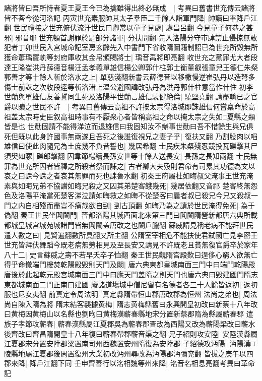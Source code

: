 諸將皆曰吾所恃者夏王夏王今已為擒雖得出終必無成　|{
	考異曰舊書世充傳云諸將皆不荅今從河洛記}
丙寅世充素服帥其太子羣臣二千餘人詣軍門降|{
	帥讀曰率降戶江翻}
世民禮接之世充俯伏流汗世民曰卿常以童子見處|{
	處昌呂翻}
今見童子何恭之甚邪|{
	邪音耶}
世充頓首謝罪於是部分諸軍|{
	分扶問翻}
先入洛陽分守市肆禁止侵掠無敢犯者丁卯世民入宫城命記室房玄齡先入中書門下省收隋圖籍制詔已為世充所毁無所獲命蕭瑀竇軌等封府庫收其金帛頒賜將士|{
	瑀音禹將即亮翻}
收世充之黨罪尤大者段達王隆崔洪丹薛德音楊汪孟孝義單雄信楊公卿郭什柱郭士衡董叡張童兒王德仁朱粲郭善才等十餘人斬於洛水之上|{
	單慈淺翻新書云薛德音以移檄慢逆崔弘丹以造弩多傷士前誅之次收段逹等斬洛渚上温公避國諱改弘丹為洪丹郭什柱意當作什住}
初李世勣與單雄信友善誓同生死及洛陽平世勣言雄信驍健絶倫|{
	驍堅堯翻}
請盡輸已之官爵以贖之世民不許　|{
	考異曰舊傳云高祖不許按太宗得洛城即誅雄信何嘗稟命於高祖盖太宗時史臣叙高祖時事有不厭衆心者皆稱高祖之命以掩太宗之失如□夏縣之類皆是也}
世勣固請不能得涕泣而退雄信曰我固知汝不辦事世勣曰吾不惜餘生與兄俱死但既以此身許國事無兩遂且吾死之後誰復視兄之妻子乎|{
	復扶又翻}
乃割股肉以㗖雄信曰使此肉隨兄為土庶幾不負昔誓也|{
	幾居希翻}
士民疾朱粲殘忍競投瓦礫擊其尸須臾如冢|{
	礫郎擊翻}
囚韋節楊續長孫安世等十餘人送長安|{
	長孫之長知兩翻}
士民無罪為世充所囚者皆釋之所殺者祭而誄之|{
	古者卿大夫殁則君命有司累其功德為文以哀之曰誄今誄之者哀其無罪而死也誄魯水翻}
初秦王府屬杜如晦叔父淹事王世充淹素與如晦兄弟不協譖如晦兄殺之又囚其弟楚客餓幾死|{
	幾居依翻又音祁}
楚客終無怨色及洛陽平淹當死楚客涕泣請如晦救之如晦不從楚客曰曩者叔已殺兄今兄又殺叔一門之内自相殘而盡豈不痛哉欲自剄|{
	剄古頂翻}
如晦乃為之請於世民淹得免死|{
	為于偽翻}
秦王世民坐閶闔門|{
	晉都洛陽其城西面北來第三門曰閶闔隋營新都唐六典所載都城皇城宫城苑城諸門皆無閶闔盖唐改之也闔戶臘翻}
蘇威請見稱老病不能拜世民遣人數之曰|{
	見賢遍翻數所具翻又所主翻}
公隋室宰相危不能扶使君弑國亡見李密王世充皆拜伏舞蹈今既老病無勞相見及至長安又請見不許既老且貧無復官爵卒於家年八十二|{
	史言蘇威之壽不若早夭卒子恤翻}
秦王世民觀隋宫殿歎曰逞侈心窮人欲無亡得乎命撤端門樓焚乾陽殿毁則天門及闕|{
	唐六典東都皇城南面三門中曰端門乾陽殿唐後於此起乾元殿宮城南面三門中曰應天門盖隋之則天門也唐六典曰毁建國門隋志東都城南面二門正南曰建國}
廢諸道塲城中僧尼留有名德者各三十人餘皆返初|{
	返初服也尼女夷翻}
前真定令周法明|{
	真定縣隋帶恒山郡唐改郡為恒州}
法尚之弟也|{
	周法尚自陳入隋為將}
隋末結客襲據黄梅|{
	隋志黄梅縣舊曰永興開皇初改曰新蔡十八年改曰黄梅因黄梅山以名縣也劉昫曰黄梅漢蘄春縣地宋分置新蔡郡隋為縣屬蘄春郡}
遣族子孝節攻蘄春|{
	蘄春漢縣屬江夏郡吳為蘄春郡晋改為西陽又改為蘄陽梁改曰蘄水後齊改曰齊昌隋開皇十八年復曰蘄春帶郡蘄音渠之翻}
兄子紹則攻安陸|{
	安陸漢縣屬江夏郡宋分置安陸郡梁置南司州西魏置安州隋復為安陸郡}
子紹德攻沔陽|{
	沔陽漢□陵縣地屬江夏郡後周置復州大業初改沔州尋改為沔陽郡沔彌兖翻}
皆拔之庚午以四郡來降|{
	降戶江翻下同}
壬申齊善行以洺相魏等州來降|{
	洺音名相息亮翻考異曰革命記}


